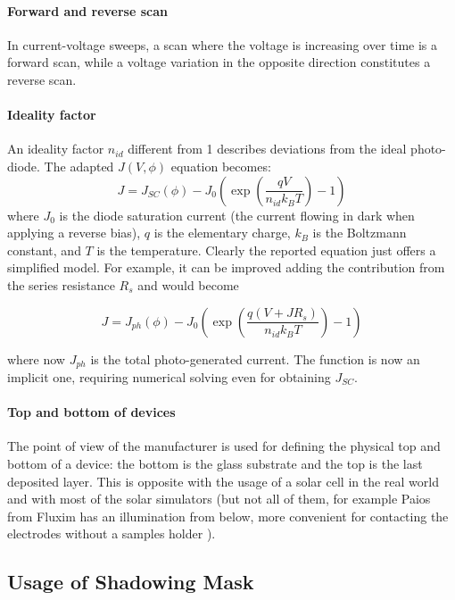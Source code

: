 		\paragraph{Forward and reverse scan} In current-voltage sweeps, a scan where the voltage is increasing over time is a forward scan, while a voltage variation in the opposite direction constitutes a reverse scan.

		\paragraph{Ideality factor} An ideality factor $n_{id}$ different from 1 describes deviations from the ideal photo-diode. The adapted $J(V,\phi)$ equation becomes\cite{Calado2018b}:
		\begin{equation} \label{eq:photodiode}
			J = J_{SC}(\phi) - J_0\left(\exp\left(\frac{qV}{n_{id}k_BT}\right)-1\right)
		\end{equation}
		where $J_0$ is the diode saturation current (the current flowing in dark when applying a reverse bias), $q$ is the elementary charge, $k_B$ is the Boltzmann constant, and $T$ is the temperature.  Clearly the reported equation just offers a simplified model. For example, it can be improved adding the contribution from the series resistance $R_s$ and would become

		$$J = J_{ph}(\phi) - J_0\left(\exp\left(\frac{q(V+JR_s)}{n_{id}k_BT}\right)-1\right)$$

		where now $J_{ph}$ is the total photo-generated current. The function is now an implicit one, requiring numerical solving even for obtaining $J_{SC}$.

		\paragraph{Top and bottom of devices} The point of view of the manufacturer is used for defining the physical top and bottom of a device: the bottom is the glass substrate and the top is the last deposited layer. This is opposite with the usage of a solar cell in the real world and with most of the solar simulators (but not all of them, for example Paios from Fluxim has an illumination from below, more convenient for contacting the electrodes without a samples holder \cite{Fluxim}).

	\subsection{Usage of Shadowing Mask}

